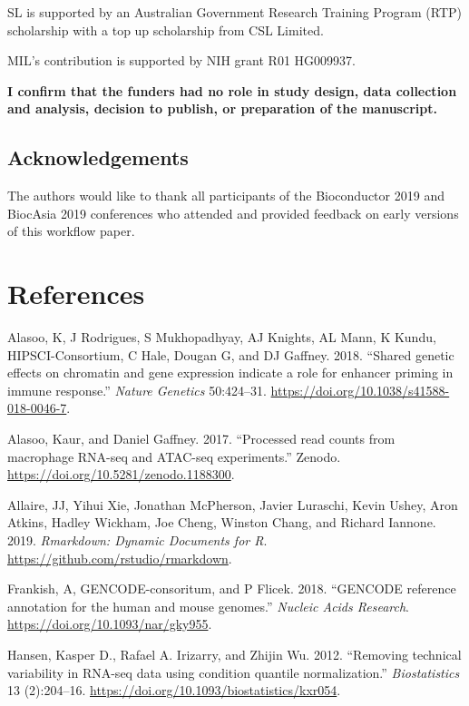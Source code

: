 \documentclass[
]{article}
\begin{document}
SL is supported by an Australian Government Research Training Program (RTP)
scholarship with a top up scholarship from CSL Limited.

MIL's contribution is supported by NIH grant R01 HG009937.

\textbf{I confirm that the funders had no role in study design, data collection and
analysis, decision to publish, or preparation of the manuscript.}

\hypertarget{acknowledgements}{%
\subsection{Acknowledgements}\label{acknowledgements}}

The authors would like to thank all participants of the Bioconductor 2019 and
BiocAsia 2019 conferences who attended and provided feedback on early versions
of this workflow paper.

\hypertarget{references}{%
\section*{References}\label{references}}

\hypertarget{refs}{}
\leavevmode\hypertarget{ref-alasoo}{}%
Alasoo, K, J Rodrigues, S Mukhopadhyay, AJ Knights, AL Mann, K Kundu, HIPSCI-Consortium, C Hale, Dougan G, and DJ Gaffney. 2018. ``Shared genetic effects on chromatin and gene expression indicate a role for enhancer priming in immune response.'' \emph{Nature Genetics} 50:424--31. \url{https://doi.org/10.1038/s41588-018-0046-7}.

\leavevmode\hypertarget{ref-alasooZenodo}{}%
Alasoo, Kaur, and Daniel Gaffney. 2017. ``Processed read counts from macrophage RNA-seq and ATAC-seq experiments.'' Zenodo. \url{https://doi.org/10.5281/zenodo.1188300}.

\leavevmode\hypertarget{ref-rmarkdown}{}%
Allaire, JJ, Yihui Xie, Jonathan McPherson, Javier Luraschi, Kevin Ushey, Aron Atkins, Hadley Wickham, Joe Cheng, Winston Chang, and Richard Iannone. 2019. \emph{Rmarkdown: Dynamic Documents for R}. \url{https://github.com/rstudio/rmarkdown}.

\leavevmode\hypertarget{ref-gencode}{}%
Frankish, A, GENCODE-consoritum, and P Flicek. 2018. ``GENCODE reference annotation for the human and mouse genomes.'' \emph{Nucleic Acids Research}. \url{https://doi.org/10.1093/nar/gky955}.

\leavevmode\hypertarget{ref-Hansen2012}{}%
Hansen, Kasper D., Rafael A. Irizarry, and Zhijin Wu. 2012. ``Removing technical variability in RNA-seq data using condition quantile normalization.'' \emph{Biostatistics} 13 (2):204--16. \url{https://doi.org/10.1093/biostatistics/kxr054}.
\end{document}

